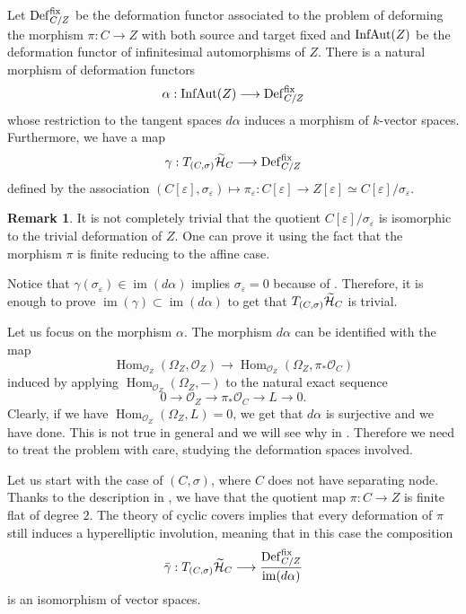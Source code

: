 \documentclass{alggeom}
\numberwithin{equation}{section}
\numberwithin{subsection}{section}
\theoremstyle{definition}
\newtheorem{remark}[theorem]{Remark}
\theoremstyle{remark}
\newcommand\cO{\mathcal{O}} \newcommand\cP{\mathcal{P}}
\newcommand\im[1]{\operatorname{im}(#1)}
\renewcommand\hom{\operatorname{Hom}}
\renewcommand{\epsilon}{\varepsilon}
\newcommand{\Htilde}{\widetilde{\cH}}
\begin{document}
Let ${\rm Def}^{\rm fix}_{C/Z}$ be the deformation functor associated to the problem of deforming the morphism $\pi:C \rightarrow Z$ with both source and target fixed and ${\rm InfAut}(Z)$ be the deformation functor of infinitesimal automorphisms of $Z$. There is a natural morphism of deformation functors
$$ \alpha:{\rm InfAut}(Z) \longrightarrow {\rm Def}^{\rm fix}_{C/Z}$$
whose restriction to the tangent spaces $d\alpha$ induces a morphism of $k$-vector spaces. Furthermore, we have a map $$\gamma:T_{(C,\sigma)}\Htilde_C \longrightarrow {\rm Def}^{\rm fix}_{C/Z} $$ defined by the association $(C[\epsilon],\sigma_{\epsilon})\mapsto \pi_{\epsilon}:C[\epsilon]\rightarrow Z[\epsilon]\simeq C[\epsilon]/\sigma_{\epsilon}$.

\begin{remark}
It is not completely trivial that the quotient $C[\epsilon]/\sigma_{\epsilon}$ is isomorphic to the trivial deformation of $Z$. One can prove it using the fact that the morphism $\pi$ is finite reducing to the affine case.
\end{remark}

Notice that $\gamma(\sigma_{\epsilon}) \in \im{d\alpha}$ implies $\sigma_{\epsilon}=0$ because of . Therefore, it is enough to prove $\im{\gamma}\subset \im{d\alpha}$ to get that $T_{(C,\sigma)}\Htilde_C$ is trivial.

Let us focus on the morphism $\alpha$. The morphism $d\alpha$ can be identified with the map 
$$ \hom_{\cO_Z}(\Omega_Z,\cO_Z) \longrightarrow \hom_{\cO_Z}(\Omega_Z,\pi_*\cO_C)$$ 
induced by applying $\hom_{\cO_Z}(\Omega_Z,-)$ to the natural exact sequence
$$ 0 \rightarrow \cO_Z \rightarrow \pi_*\cO_C \rightarrow L\rightarrow 0 .$$
Clearly, if we have $\hom_{\cO_Z}(\Omega_Z, L)=0$, we get that $d\alpha$ is surjective and we have done. This is not true in general and we will see why in . Therefore we need to treat the problem with care, studying the deformation spaces involved. 

Let us start with the case of $(C,\sigma)$, where $C$ does not have separating node. Thanks to the description in , we have that the quotient map $\pi:C \rightarrow Z$ is finite flat of degree $2$. The theory of cyclic covers implies that every deformation of $\pi$ still induces a hyperelliptic involution, meaning that in this case the composition 
$$ \bar{\gamma}: T_{(C,\sigma)}\Htilde_C \longrightarrow \frac{{\rm Def}^{\rm fix}_{C/Z}}{\im{d\alpha}} $$
is an isomorphism of vector spaces. 
\end{document}
